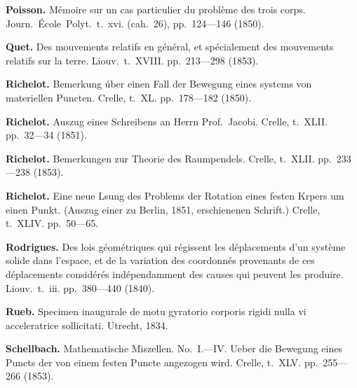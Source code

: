 \documentclass[11pt,a4paper]{book}
\begin{document}
\vspace{0.5em}

\noindent\textbf{Poisson.} M\'{e}moire sur un cas particulier du probl\`{e}me des trois corps. Journ.~\'{E}cole~Polyt.~t.~xvi. (cah.~26), pp.~124---146 (1850).

\vspace{0.5em}

\noindent\textbf{Quet.} Des mouvements relatifs en g\'{e}n\'{e}ral, et sp\'{e}cialement des mouvements relatifs sur la terre. Liouv.~t.~XVIII. pp.~213---298 (1853).

\vspace{0.5em}

\noindent\textbf{Richelot.} Bemerkung \'{u}ber einen Fall der Bewegung eines systems von materiellen Puncten. Crelle, t.~XL. pp.~178---182 (1850).

\vspace{0.5em}

\noindent\textbf{Richelot.} Auszug eines Schreibens an Herrn Prof.~Jacobi. Crelle, t.~XLII. pp.~32---34 (1851).

\vspace{0.5em}

\noindent\textbf{Richelot.} Bemerkungen zur Theorie des Raumpendels. Crelle, t.~XLII. pp.~233---238 (1853).

\vspace{0.5em}

\noindent\textbf{Richelot.} Eine neue Lsung des Problems der Rotation eines festen Krpers um einen Punkt. (Auszug einer zu Berlin, 1851, erschienenen Schrift.) Crelle, t.~XLIV. pp.~50---65.

\vspace{0.5em}

\noindent\textbf{Rodrigues.} Des lois g\'{e}om\'{e}triques qui r\'{e}gissent les d\'{e}placements d'un syst\`{e}me solide dans l'espace, et de la variation des coordonn\'{e}s provenants de ces d\'{e}placements consid\'{e}r\'{e}s ind\'{e}pendamment des causes qui peuvent les produire. Liouv.~t.~iii. pp.~380---440 (1840).

\vspace{0.5em}

\noindent\textbf{Rueb.} Specimen inaugurale de motu gyratorio corporis rigidi nulla vi acceleratrice sollicitati. Utrecht, 1834.

\vspace{0.5em}

\noindent\textbf{Schellbach.} Mathematische Miszellen. No.~I.---IV. Ueber die Bewegung eines Puncts der von einem festen Puncte angezogen wird. Crelle, t.~XLV. pp.~255---266 (1853).
\end{document}
